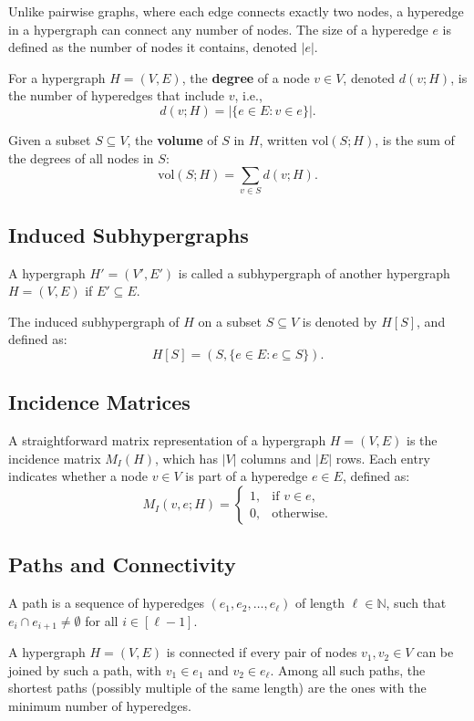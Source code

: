\documentclass{article}
\begin{document}
Unlike pairwise graphs, where each edge connects exactly two nodes, a hyperedge in a hypergraph can connect any number of nodes. The size of a hyperedge \( e \) is defined as the number of nodes it contains, denoted \( |e| \).

For a hypergraph \( H = (V, E) \), the \textbf{degree} of a node \( v \in V \), denoted \( d(v; H) \), is the number of hyperedges that include \( v \), i.e.,
\[
d(v; H) = \left| \{ e \in E : v \in e \} \right|.
\]

Given a subset \( S \subseteq V \), the \textbf{volume} of \( S \) in \( H \), written \( \text{vol}(S; H) \), is the sum of the degrees of all nodes in \( S \):
\[
\text{vol}(S; H) = \sum_{v \in S} d(v; H).
\]

\subsection*{Induced Subhypergraphs}

A hypergraph \( H' = (V', E') \) is called a subhypergraph of another hypergraph \( H = (V, E) \) if \( E' \subseteq E \).

The induced subhypergraph of \( H \) on a subset \( S \subseteq V \) is denoted by \( H[S] \), and defined as:
\[
H[S] = (S, \{ e \in E : e \subseteq S \}).
\]

\subsection*{Incidence Matrices}

A straightforward matrix representation of a hypergraph \( H = (V, E) \) is the incidence matrix \( M_I(H) \), which has \( |V| \) columns and \( |E| \) rows. Each entry indicates whether a node \( v \in V \) is part of a hyperedge \( e \in E \), defined as:
\[
M_I(v, e; H) =
\begin{cases}
1, & \text{if } v \in e, \\
0, & \text{otherwise}.
\end{cases}
\]

\subsection*{Paths and Connectivity}

A path is a sequence of hyperedges \( (e_1, e_2, \ldots, e_\ell) \) of length \( \ell \in \mathbb{N} \), such that \( e_i \cap e_{i+1} \neq \emptyset \) for all \( i \in [\ell - 1] \).

A hypergraph \( H = (V, E) \) is connected if every pair of nodes \( v_1, v_2 \in V \) can be joined by such a path, with \( v_1 \in e_1 \) and \( v_2 \in e_\ell \). Among all such paths, the shortest paths (possibly multiple of the same length) are the ones with the minimum number of hyperedges.
\end{document}

